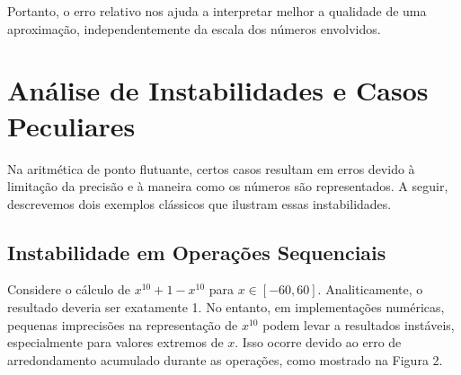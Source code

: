 Portanto, o erro relativo nos ajuda a interpretar melhor a qualidade de uma aproximação, independentemente da escala dos números envolvidos.

\section{Análise de Instabilidades e Casos Peculiares}

Na aritmética de ponto flutuante, certos casos resultam em erros devido à limitação da precisão e à maneira como os números são representados. A seguir, descrevemos dois exemplos clássicos que ilustram essas instabilidades.

\subsection{Instabilidade em Operações Sequenciais}
Considere o cálculo de $x^{10} + 1 - x^{10}$ para \(x \in [-60, 60]\). Analiticamente, o resultado deveria ser exatamente 1. No entanto, em implementações numéricas, pequenas imprecisões na representação de \(x^{10}\) podem levar a resultados instáveis, especialmente para valores extremos de \(x\). Isso ocorre devido ao erro de arredondamento acumulado durante as operações, como mostrado na Figura 2.

